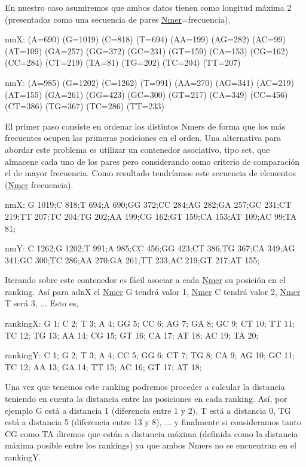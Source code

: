 En nuestro caso asumiremos que ambos datos tienen como longitud máxima 2 (presentados como una secuencia de pares \hyperlink{classNmer}{Nmer}=frecuencia).

\begin{DoxyItemize}
\item nmX\+: (A=690) (G=1019) (C=818) (T=694) (AA=199) (AG=282) (AC=99) (AT=109) (GA=257) (GG=372) (GC=231) (GT=159) (CA=153) (CG=162) (CC=284) (CT=219) (TA=81) (TG=202) (TC=204) (TT=207) \item nmY\+: (A=985) (G=1202) (C=1262) (T=991) (AA=270) (AG=341) (AC=219) (AT=155) (GA=261) (GG=423) (GC=300) (GT=217) (CA=349) (CC=456) (CT=386) (TG=367) (TC=286) (TT=233)\end{DoxyItemize}
El primer paso consiste en ordenar los distintos Nmers de forma que los más frecuentes ocupen las primeras posiciones en el orden. Una alternativa para abordar este problema es utilizar un contenedor asociativo, tipo set, que almacene cada uno de los pares pero considerando como criterio de comparación el de mayor frecuencia. Como resultado tendríamos este secuencia de elementos (\hyperlink{classNmer}{Nmer} frecuencia).

\begin{DoxyItemize}
\item nmX\+: G 1019;C 818;T 694;A 690;GG 372;CC 284;AG 282;GA 257;GC 231;CT 219;TT 207;TC 204;TG 202;AA 199;CG 162;GT 159;CA 153;AT 109;AC 99;TA 81; \item nmY\+: C 1262;G 1202;T 991;A 985;CC 456;GG 423;CT 386;TG 367;CA 349;AG 341;GC 300;TC 286;AA 270;GA 261;TT 233;AC 219;GT 217;AT 155;\end{DoxyItemize}
Iterando sobre este contenedor es fácil asociar a cada \hyperlink{classNmer}{Nmer} su posición en el ranking. Así para adnX el \hyperlink{classNmer}{Nmer} G tendrá valor 1, \hyperlink{classNmer}{Nmer} C tendrá valor 2, \hyperlink{classNmer}{Nmer} T será 3, ... Esto es,

\begin{DoxyItemize}
\item rankingX\+: G 1; C 2; T 3; A 4; GG 5; CC 6; AG 7; GA 8; GC 9; CT 10; TT 11; TC 12; TG 13; AA 14; CG 15; GT 16; CA 17; AT 18; AC 19; TA 20; \item rankingY\+: C 1; G 2; T 3; A 4; CC 5; GG 6; CT 7; TG 8; CA 9; AG 10; GC 11; TC 12; AA 13; GA 14; TT 15; AC 16; GT 17; AT 18;\end{DoxyItemize}
Una vez que tenemos este ranking podremos proceder a calcular la distancia teniendo en cuenta la distancia entre las posiciones en cada ranking. Así, por ejemplo G está a distancia 1 (diferencia entre 1 y 2), T está a distancia 0, TG está a distancia 5 (diferencia entre 13 y 8), ... y finalmente si consideramos tanto CG como TA diremos que están a distancia máxima (definida como la distancia máxima posible entre los rankings) ya que ambos Nmers no se encuentran en el rankingY.

